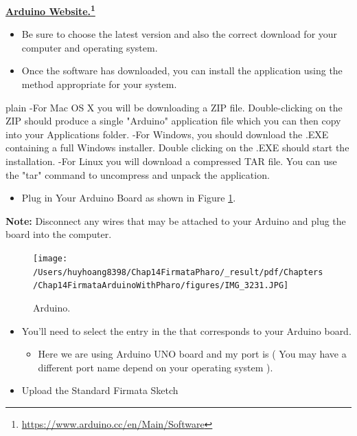 \documentclass[10pt,twoside,english]{_support/latex/sbabook/sbabook}
\begin{document}
\textbf{\href{https://www.arduino.cc/en/Main/Software}{Arduino Website.}\footnote{\url{https://www.arduino.cc/en/Main/Software}}} 

\begin{itemize}
\item Be sure to choose the latest version and also the correct download for your computer and operating system.
\item Once the software has downloaded, you can install the application using the method appropriate for your system. 
\end{itemize}

\begin{displaycode}{plain}
  -For Mac OS X you will be downloading a ZIP file. Double-clicking on the ZIP should produce a single "Arduino" application file which you can then copy into your Applications folder.
  -For Windows, you should download the .EXE containing a full Windows installer. Double clicking on the .EXE should start the installation.
  -For Linux you will download a compressed TAR file. You can use the "tar" command to uncompress and unpack the application.
\end{displaycode}

\begin{itemize}
\item Plug in Your Arduino Board as shown in Figure \ref{ArduinoConnection}.
\end{itemize}

\textbf{Note:} Disconnect any wires that may be attached to your Arduino and plug the board into the computer.

\begin{figure}

\begin{center}
\texttt{[image: /Users/huyhoang8398/Chap14FirmataPharo/\_result/pdf/Chapters/Chap14FirmataArduinoWithPharo/figures/IMG\_3231.JPG]}\caption{Arduino.\label{ArduinoConnection}}\end{center}
\end{figure}


\begin{itemize}
\item You'll need to select the entry in the  that corresponds to your Arduino board. 
\begin{itemize}
\item Here we are using Arduino UNO board and my port is  ( You may have a different port name depend on your operating system ).
\end{itemize}

\item Upload the Standard Firmata Sketch
\end{itemize}
\end{document}
